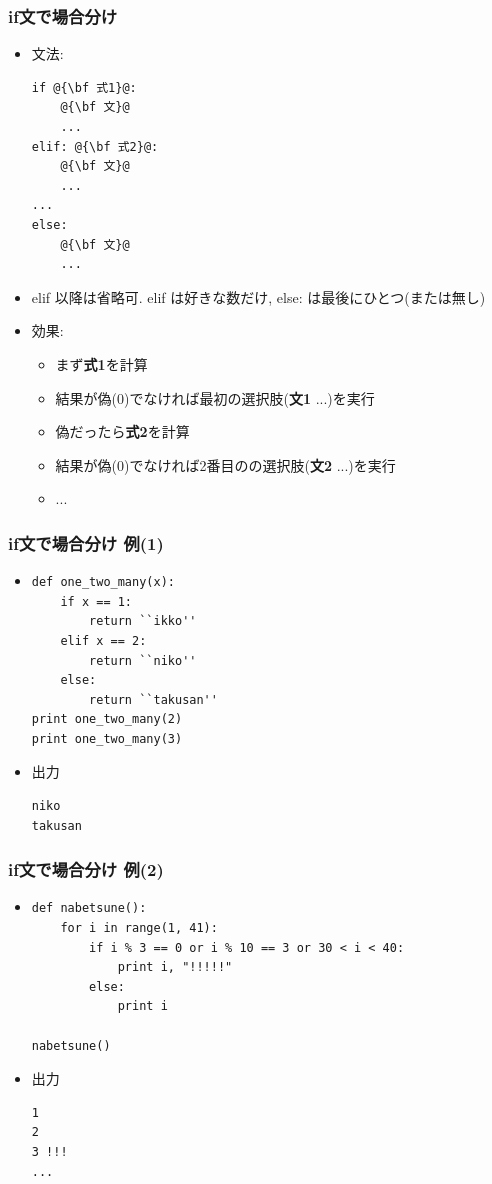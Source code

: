 \documentclass[10pt,dvipdfmx]{beamer}
\begin{document}
\begin{frame}[fragile]
\frametitle{if文で場合分け}
\begin{itemize}
\item 文法:
\begin{lstlisting}
if @{\bf 式1}@:
    @{\bf 文}@
    ...
elif: @{\bf 式2}@:
    @{\bf 文}@
    ...
...
else:
    @{\bf 文}@
    ...
\end{lstlisting}
\item elif 以降は省略可. elif は好きな数だけ, else: は最後にひとつ(または無し)
\item 効果:
  \begin{itemize}
  \item まず{\bf 式1}を計算
  \item 結果が偽(0)でなければ最初の選択肢({\bf 文1} ...)を実行
  \item 偽だったら{\bf 式2}を計算
  \item 結果が偽(0)でなければ2番目のの選択肢({\bf 文2} ...)を実行
  \item ...
  \end{itemize}
\end{itemize}
\end{frame}


\begin{frame}[fragile]
\frametitle{if文で場合分け 例(1)}
\begin{itemize}
\item<1->
\begin{lstlisting}
def one_two_many(x):
    if x == 1:
        return ``ikko''
    elif x == 2:
        return ``niko''
    else:
        return ``takusan''
print one_two_many(2)
print one_two_many(3)
\end{lstlisting}

\item<2> 出力
\begin{lstlisting}
niko
takusan
\end{lstlisting}
\end{itemize}
\end{frame}


\begin{frame}[fragile]
\frametitle{if文で場合分け 例(2)}
\begin{itemize}
\item<1->
\begin{lstlisting}
def nabetsune():
    for i in range(1, 41):
        if i % 3 == 0 or i % 10 == 3 or 30 < i < 40:
            print i, "!!!!!"
        else:
            print i

nabetsune()
\end{lstlisting}
\item<2>  出力
\begin{lstlisting}
1
2
3 !!!
...
\end{lstlisting}
\end{itemize}
\end{frame}
\end{document}
